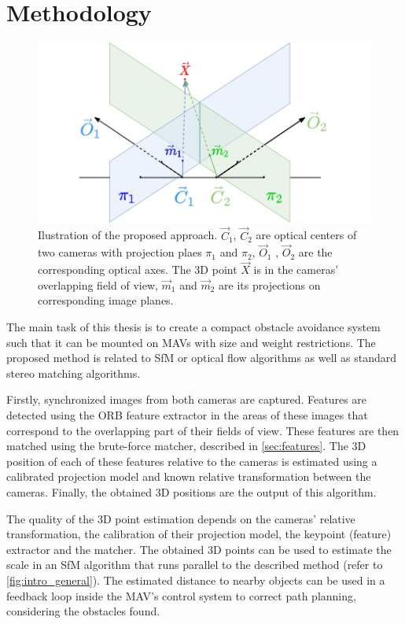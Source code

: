 \chapter{Methodology}

\label{chapter:methodology}

\begin{figure}[h]
    \centering
    \includegraphics[width=.8\textwidth]{graphics/td90deg.png}
    \caption[The proposed approach model.]{Ilustration of the proposed approach. $\vec{C}_1$, $\vec{C}_2$ are optical centers of two cameras with projection plaes $\pi_1$ and $\pi_2$, $\vec{O}_1$ , $\vec{O}_2$ are the corresponding optical axes. The 3D point $\vec{X}$ is in the cameras' overlapping field of view, $\vec{m}_1$ and $\vec{m}_2$ are its projections on corresponding image planes.}
    \label{fig:td90deg}
\end{figure}

The main task of this thesis is to create a compact obstacle avoidance system such that it can be mounted on MAVs with size and weight restrictions.
The proposed method is related to SfM or optical flow algorithms as well as standard stereo matching algorithms.

Firstly, synchronized images from both cameras are captured. Features are detected using the ORB feature extractor \cite{Rublee2011} in the areas of these images that correspond to the overlapping part of their fields of view. 
These features are then matched using the brute-force matcher, described in \autoref{sec:features}.
The 3D position of each of these features relative to the cameras is estimated using a calibrated projection model and known relative transformation between the cameras.
Finally, the obtained 3D positions are the output of this algorithm. 

The quality of the 3D point estimation depends on the cameras' relative transformation, the calibration of their projection model, the keypoint (feature) extractor and the matcher.
The obtained 3D points can be used to estimate the scale in an SfM algorithm that runs parallel to the described method (refer to  \autoref{fig:intro_general}).
The estimated distance to nearby objects can be used in a feedback loop inside the MAV's control system to correct path planning, considering the obstacles found.

